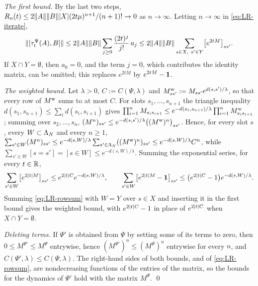 \emph{The first bound.} By the last two steps, $R_n(t)\le2\lVert A\rVert\lVert B\rVert\lvert X\rvert(2t\mu)^{n+1}/(n+1)!\to0$ as $n\to\infty$.
Letting $n\to\infty$ in \eqref{eq:LR-iterate},
\[
\norm{[\tau^\Psi_t(A),B]}\le2\norm A\norm B\sum_{j\ge0}\frac{(2t)^j}{j!}\,a_j\le2\norm A\norm B\sum_{s\in X,\ s'\in Y}\bigl[e^{2tM}\bigr]_{ss'}.
\]
If $X\cap Y=\emptyset$, then $a_0=0$, and the term $j=0$, which contributes the identity matrix, can be omitted; this
replaces $e^{2tM}$ by $e^{2tM}-\mathbf{1}$.

\emph{The weighted bound.} Let $\lambda>0$, $C:=C(\Psi,\lambda)$ and $M^{\rm w}_{ss'}:=M_{ss'}e^{d(s,s')/\lambda}$, so that
every row of $M^{\rm w}$ sums to at most $C$. For slots $s_1,\dots,s_{n+1}$ the triangle inequality
$d(s_1,s_{n+1})\le\sum_id(s_i,s_{i+1})$ gives $\prod_{i=1}^nM_{s_is_{i+1}}\le e^{-d(s_1,s_{n+1})/\lambda}\prod_{i=1}^nM^{\rm w}_{s_is_{i+1}}$;
summing over $s_2,\dots,s_n$, $(M^n)_{ss'}\le e^{-d(s,s')/\lambda}\bigl((M^{\rm w})^n\bigr)_{ss'}$. Hence, for every slot $s$,
every $W\subset\Lambda_N$ and every $n\ge1$,
$\sum_{s'\in W}(M^n)_{ss'}\le e^{-d(s,W)/\lambda}\sum_{s'\in\Lambda_N}((M^{\rm w})^n)_{ss'}\le e^{-d(s,W)/\lambda}C^n$, while
$\sum_{s'\in W}[s=s']=[s\in W]\le e^{-d(s,W)/\lambda}$. Summing the exponential series, for every $t\in\mathbb{R}$,
\begin{equation}\label{eq:LR-rowsum}
\sum_{s'\in W}\bigl[e^{2\lvert t\rvert M}\bigr]_{ss'}\le e^{2\lvert t\rvert C}e^{-d(s,W)/\lambda},\qquad
\sum_{s'\in W}\bigl[e^{2\lvert t\rvert M}-\mathbf{1}\bigr]_{ss'}\le\bigl(e^{2\lvert t\rvert C}-1\bigr)e^{-d(s,W)/\lambda}.
\end{equation}
Summing \eqref{eq:LR-rowsum} with $W=Y$ over $s\in X$ and inserting it in the first bound gives the weighted bound,
with $e^{2\lvert t\rvert C}-1$ in place of $e^{2\lvert t\rvert C}$ when $X\cap Y=\emptyset$.

\emph{Deleting terms.} If $\Psi'$ is obtained from $\Psi$ by setting some of its terms to zero, then
$0\le M^{\Psi'}\le M^\Psi$ entrywise, hence $(M^{\Psi'})^n\le(M^\Psi)^n$ entrywise for every $n$, and
$C(\Psi',\lambda)\le C(\Psi,\lambda)$. The right-hand sides of both bounds, and of \eqref{eq:LR-rowsum}, are nondecreasing
functions of the entries of the matrix, so the bounds for the dynamics of $\Psi'$ hold with the matrix $M^\Psi$.
\qed
